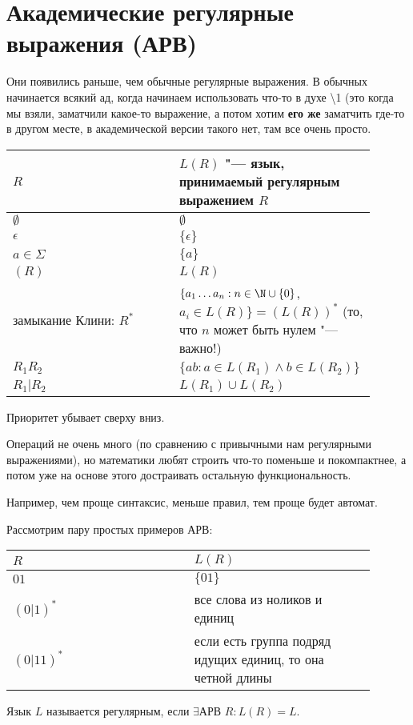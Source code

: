 \section{Академические регулярные выражения (АРВ)}
Они появились раньше, чем обычные регулярные выражения. В обычных начинается всякий ад, когда начинаем использовать что-то в духе \textbackslash1
(это когда мы взяли, заматчили какое-то выражение, а потом хотим \textbf{его же} заматчить где-то в другом месте, в академической версии такого нет, там все очень просто.

\begin{tabular}{p{0.45\linewidth}|p{0.45\linewidth}}
$R$ & $L(R)$ "--- язык, принимаемый регулярным выражением $R$ \\
\hline
$\emptyset$ & $\emptyset$ \\
$\epsilon$ & $\{\epsilon\}$ \\
$a \in \Sigma$ & $\{a\}$ \\
$(R)$ & $L(R)$ \\
замыкание Клини: $R^*$ & $\{a_1 \dots a_n: n \in \N \cup \{0\}$, $a_i \in L(R)\} = (L(R))^*$ (то, что $n$ может быть нулем "--- важно!) \\
$R_1R_2$ & $\{ab: a \in L(R_1) \land b \in L(R_2)\}$ \\
$R_1 | R_2$ & $L(R_1) \cup L(R_2)$
\end{tabular}

Приоритет убывает сверху вниз.

\begin{Rem}
Операций не очень много (по сравнению с привычными нам регулярными выражениями), но математики любят строить что-то поменьше и покомпактнее, а потом уже на основе этого достраивать остальную функциональность.

Например, чем проще синтаксис, меньше правил, тем проще будет автомат.
\end{Rem}

\begin{exmp}
Рассмотрим пару простых примеров АРВ:

\begin{tabular}{p{0.45\linewidth} | p{0.45\linewidth}}
$R$ & $L(R)$ \\
\hline
$01$ & $\{01\}$ \\
$(0|1)^*$ & все слова из ноликов и единиц \\
$(0|11)^*$ & если есть группа подряд идущих единиц, то она четной длины
\end{tabular}
\end{exmp}

\begin{Def}
Язык $L$ называется регулярным, если $\exists \text{АРВ } R: L(R) = L$.
\end{Def}